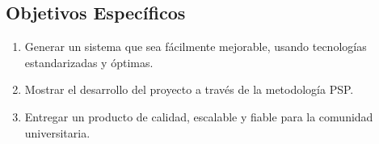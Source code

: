 \documentclass[a4paper,12pt,openany,oneside]{book}
\begin{document}
\subsection{Objetivos Específicos}
\begin{enumerate}
	\item Generar un sistema que sea fácilmente mejorable, usando tecnologías estandarizadas y óptimas.
	\item Mostrar el desarrollo del proyecto a través de la metodología PSP.
	\item Entregar un producto de calidad, escalable y fiable para la comunidad universitaria.
\end{enumerate}

\end{document}
